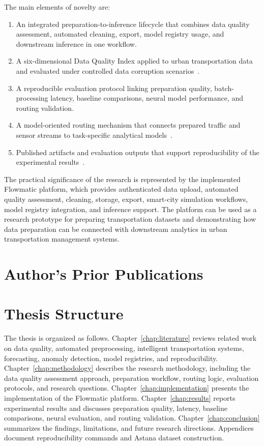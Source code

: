 The main elements of novelty are:
\begin{enumerate}
  \item An integrated preparation-to-inference lifecycle that combines data quality assessment, automated cleaning, export, model registry usage, and downstream inference in one workflow.
  \item A six-dimensional Data Quality Index applied to urban transportation data and evaluated under controlled data corruption scenarios~\cite{yedilkhan2025flowmatic}.
  \item A reproducible evaluation protocol linking preparation quality, batch-processing latency, baseline comparisons, neural model performance, and routing validation.
  \item A model-oriented routing mechanism that connects prepared traffic and sensor streams to task-specific analytical models~\cite{bakytuly2026microservices}.
  \item Published artifacts and evaluation outputs that support reproducibility of the experimental results~\cite{kreutzberger2022mlops,wolf2020transformers}.
\end{enumerate}

The practical significance of the research is represented by the implemented Flowmatic platform, which provides authenticated data upload, automated quality assessment, cleaning, storage, export, smart-city simulation workflows, model registry integration, and inference support. The platform can be used as a research prototype for preparing transportation datasets and demonstrating how data preparation can be connected with downstream analytics in urban transportation management systems.

\section{Author's Prior Publications}
\label{sec:author-pubs}



\section{Thesis Structure}

The thesis is organized as follows. Chapter~\ref{chap:literature} reviews related work on data quality, automated preprocessing, intelligent transportation systems, forecasting, anomaly detection, model registries, and reproducibility. Chapter~\ref{chap:methodology} describes the research methodology, including the data quality assessment approach, preparation workflow, routing logic, evaluation protocols, and research questions. Chapter~\ref{chap:implementation} presents the implementation of the Flowmatic platform. Chapter~\ref{chap:results} reports experimental results and discusses preparation quality, latency, baseline comparisons, neural evaluation, and routing validation. Chapter~\ref{chap:conclusion} summarizes the findings, limitations, and future research directions. Appendices document reproducibility commands and Astana dataset construction.
